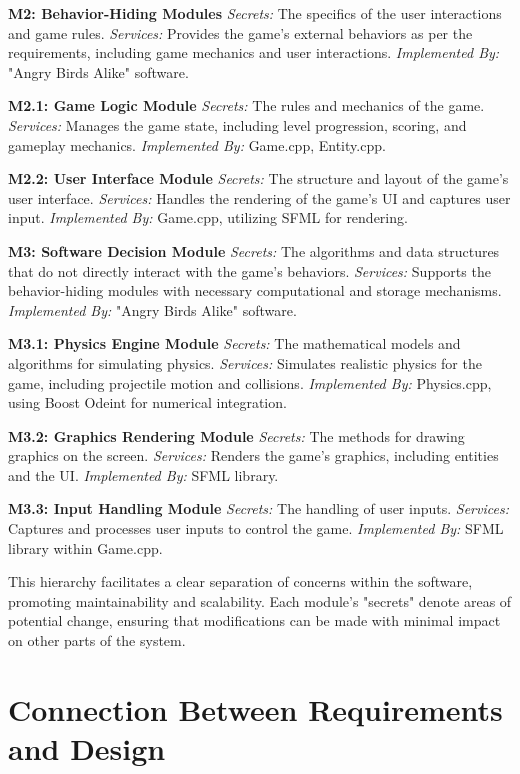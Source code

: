 \documentclass[12pt]{article}
\begin{document}
\textbf{M2: Behavior-Hiding Modules}
\textit{Secrets:} The specifics of the user interactions and game rules.
\textit{Services:} Provides the game's external behaviors as per the requirements, including game mechanics and user interactions.
\textit{Implemented By:} "Angry Birds Alike" software.

\textbf{M2.1: Game Logic Module}
\textit{Secrets:} The rules and mechanics of the game.
\textit{Services:} Manages the game state, including level progression, scoring, and gameplay mechanics.
\textit{Implemented By:} Game.cpp, Entity.cpp.

\textbf{M2.2: User Interface Module}
\textit{Secrets:} The structure and layout of the game's user interface.
\textit{Services:} Handles the rendering of the game's UI and captures user input.
\textit{Implemented By:} Game.cpp, utilizing SFML for rendering.

\textbf{M3: Software Decision Module}
\textit{Secrets:} The algorithms and data structures that do not directly interact with the game's behaviors.
\textit{Services:} Supports the behavior-hiding modules with necessary computational and storage mechanisms.
\textit{Implemented By:} "Angry Birds Alike" software.

\textbf{M3.1: Physics Engine Module}
\textit{Secrets:} The mathematical models and algorithms for simulating physics.
\textit{Services:} Simulates realistic physics for the game, including projectile motion and collisions.
\textit{Implemented By:} Physics.cpp, using Boost Odeint for numerical integration.

\textbf{M3.2: Graphics Rendering Module}
\textit{Secrets:} The methods for drawing graphics on the screen.
\textit{Services:} Renders the game's graphics, including entities and the UI.
\textit{Implemented By:} SFML library.

\textbf{M3.3: Input Handling Module}
\textit{Secrets:} The handling of user inputs.
\textit{Services:} Captures and processes user inputs to control the game.
\textit{Implemented By:} SFML library within Game.cpp.

This hierarchy facilitates a clear separation of concerns within the software, promoting maintainability and scalability. Each module's "secrets" denote areas of potential change, ensuring that modifications can be made with minimal impact on other parts of the system.

\section{Connection Between Requirements and Design}
\end{document}
